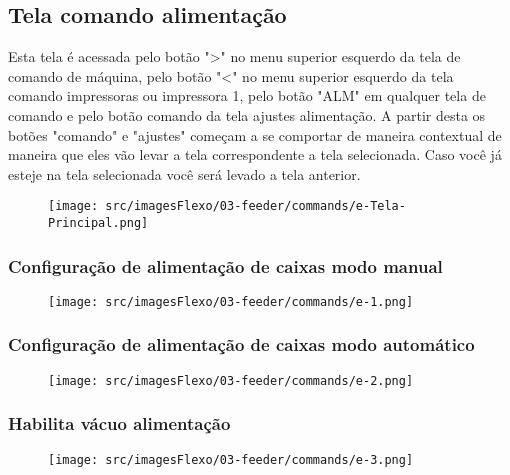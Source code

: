 \newpage
\thispagestyle{fancy}
\vspace*{\fill}
\subsection{Tela comando alimentação}
 Esta tela é acessada pelo botão "\textgreater" no menu superior esquerdo da tela de comando de máquina, pelo botão "\textless{}" no menu superior esquerdo da tela comando impressoras ou impressora 1, pelo botão "ALM" em qualquer tela de comando e pelo botão comando da tela ajustes alimentação. A partir desta os botões "comando" e "ajustes" começam a se comportar de maneira contextual de maneira que eles vão levar a tela correspondente a tela selecionada. Caso você já esteje na tela selecionada você será levado a tela anterior.
\begin{figure}[h]
  \centering
  \texttt{[image: src/imagesFlexo/03-feeder/commands/e-Tela-Principal.png]}
\end{figure}

\newpage
\thispagestyle{fancy}
\vspace*{\fill}
\subsubsection{\small{Configuração de alimentação de caixas modo manual}}
\begin{figure}[h]
  \centering
  \texttt{[image: src/imagesFlexo/03-feeder/commands/e-1.png]}
\end{figure}
\vspace*{\fill}


\newpage
\thispagestyle{fancy}
\vspace*{\fill}
\subsubsection{\small{Configuração de alimentação de caixas modo automático}}
\begin{figure}[h]
  \centering
  \texttt{[image: src/imagesFlexo/03-feeder/commands/e-2.png]}
\end{figure}
\vspace*{\fill}

\newpage
\thispagestyle{fancy}
\vspace*{\fill}
\subsubsection{\small{Habilita vácuo alimentação}}
\begin{figure}[h]
  \centering
  \texttt{[image: src/imagesFlexo/03-feeder/commands/e-3.png]}
\end{figure}
\vspace*{\fill}

